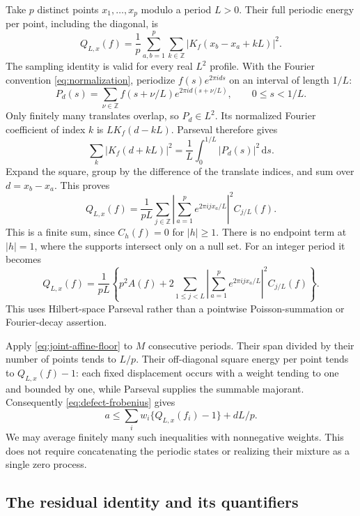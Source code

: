 \documentclass[11pt,reqno]{amsart}
\numberwithin{equation}{section}
\newcommand{\Z}{\mathbb Z}
\newcommand{\dd}{\,\mathrm d}
\begin{document}
Take $p$ distinct points $x_1,\ldots,x_p$ modulo a period $L>0$.
Their full periodic energy per point, including the diagonal, is
\begin{equation}
 Q_{L,x}(f)=\frac1p\sum_{a,b=1}^p\sum_{k\in\Z}
 |K_f(x_b-x_a+kL)|^2.
 \label{eq:periodic-full-energy}
\end{equation}
The sampling identity is valid for every real $L^2$ profile.
With the Fourier convention \eqref{eq:normalization},
periodize $f(s)e^{2\pi ids}$ on an interval of length $1/L$:
\[
 P_d(s)=\sum_{\nu\in\Z}
 f(s+\nu/L)e^{2\pi id(s+\nu/L)},\qquad 0\le s<1/L.
\]
Only finitely many translates overlap, so $P_d\in L^2$.
Its normalized Fourier coefficient of index $k$ is $LK_f(d-kL)$.
Parseval therefore gives
\[
 \sum_k|K_f(d+kL)|^2
 =\frac1L\int_0^{1/L}|P_d(s)|^2\dd s.
\]
Expand the square, group by the difference of the translate indices,
and sum over $d=x_b-x_a$. This proves
\begin{equation}
 Q_{L,x}(f)=\frac1{pL}\sum_{j\in\Z}
 \left|\sum_{a=1}^p e^{2\pi ijx_a/L}\right|^2 C_{j/L}(f).
 \label{eq:periodic-autocorrelation}
\end{equation}
This is a finite sum, since $C_h(f)=0$ for $|h|\ge1$.
There is no endpoint term at $|h|=1$, where the supports intersect
only on a null set. For an integer period it becomes
\begin{equation}
 Q_{L,x}(f)=\frac1{pL}\left\{
 p^2A(f)+2\sum_{1\le j<L}
 \left|\sum_{a=1}^pe^{2\pi ijx_a/L}\right|^2C_{j/L}(f)\right\}.
 \label{eq:integer-period-energy}
\end{equation}
This uses Hilbert-space Parseval rather than a pointwise
Poisson-summation or Fourier-decay assertion.

Apply \eqref{eq:joint-affine-floor} to $M$ consecutive periods.
Their span divided by their number of points tends to $L/p$.
Their off-diagonal square energy per point tends to $Q_{L,x}(f)-1$:
each fixed displacement occurs with a weight tending to one and
bounded by one, while Parseval supplies the summable majorant.
Consequently \eqref{eq:defect-frobenius} gives
\begin{equation}
 a\le\sum_iw_i\{Q_{L,x}(f_i)-1\}+dL/p.
 \label{eq:periodic-floor-test}
\end{equation}
We may average finitely many such inequalities with nonnegative
weights. This does not require concatenating the periodic states
or realizing their mixture as a single zero process.

\subsection{The residual identity and its quantifiers}
\end{document}
